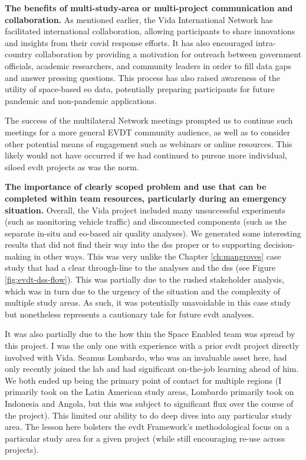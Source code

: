 \textbf{The benefits of multi-study-area or multi-project communication and collaboration.} As mentioned earlier, the Vida International Network has facilitated international collaboration, allowing participants to share innovations and insights from their \ac{covid} response efforts. It has also encouraged intra-country collaboration by providing a motivation for outreach between government officials, academic researchers, and community leaders in order to fill data gaps and answer pressing questions. This process has also raised awareness of the utility of space-based \ac{eo} data, potentially preparing participants for future pandemic and non-pandemic applications. 

The success of the multilateral Network meetings prompted us to continue such meetings for a more general EVDT community audience, as well as to consider other potential means of engagement such as webinars or online resources. This likely would not have occurred if we had continued to pursue more individual, siloed \ac{evdt} projects as was the norm.

\textbf{The importance of clearly scoped problem and use that can be completed within team resources, particularly during an emergency situation.} Overall, the Vida project included many unsuccessful experiments (such as monitoring vehicle traffic) and disconnected components (such as the separate in-situ and \ac{eo}-based air quality analyses). We generated some interesting results that did not find their way into the \ac{dss} proper or to supporting decision-making in other ways. This was very unlike the Chapter \ref{ch:mangroves} case study that had a clear through-line to the analyses and the \ac{dss} (see Figure \ref{fig:evdt-dss-flow}). This was partially due to the rushed stakeholder analysis, which was in turn due to the urgency of the situation and the complexity of multiple study areas. As such, it was potentially unavoidable in this case study but nonetheless represents a cautionary tale for future \ac{evdt} analyses.

It was also partially due to the how thin the Space Enabled team was spread by this project. I was the only one with experience with a prior \ac{evdt} project directly involved with Vida. Seamus Lombardo, who was an invaluable asset here, had only recently joined the lab and had significant on-the-job learning ahead of him. We both ended up being the primary point of contact for multiple regions (I primarily took on the Latin American study areas, Lombardo primarily took on Indonesia and Angola, but this was subject to significant flux over the course of the project). This limited our ability to do deep dives into any particular study area. The lesson here bolsters the \ac{evdt} Framework's methodological focus on a particular study area for a given project (while still encouraging re-use across projects). 

